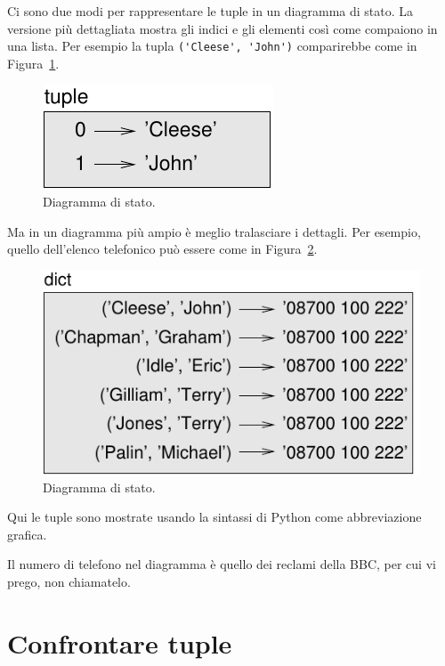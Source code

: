 \documentclass[10pt]{book}
\begin{document}
Ci sono due modi per rappresentare le tuple in un diagramma di stato. La versione più dettagliata mostra gli indici e gli elementi così come compaiono in una lista. Per esempio la tupla \verb"('Cleese', 'John')" comparirebbe come in Figura~\ref{fig.tuple1}.

\begin{figure}
\centerline
{\includegraphics[scale=0.8]{figs/tuple1.pdf}}
\caption{Diagramma di stato.}
\label{fig.tuple1}
\end{figure}

Ma in un diagramma più ampio è meglio tralasciare i dettagli. Per esempio, quello dell'elenco telefonico può essere come in Figura~\ref{fig.dict2}.

\begin{figure}
\centerline
{\includegraphics[scale=0.8]{figs/dict2.pdf}}
\caption{Diagramma di stato.}
\label{fig.dict2}
\end{figure}

Qui le tuple sono mostrate usando la sintassi di Python come abbreviazione grafica.

Il numero di telefono nel diagramma è quello dei reclami della BBC, per cui vi prego, non chiamatelo.



\section{Confrontare tuple}
\end{document}
